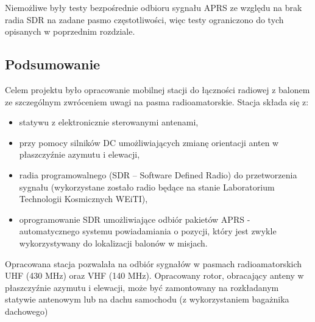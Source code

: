 Niemożliwe były testy bezpośrednie odbioru sygnału APRS ze względu na brak radia SDR na zadane pasmo częstotliwości, więc testy ograniczono do tych opisanych w poprzednim rozdziale.

\subsection{Podsumowanie}

Celem projektu było opracowanie mobilnej stacji do łączności radiowej z
balonem ze szczególnym zwróceniem uwagi na pasma radioamatorskie.
Stacja składa się z:
\begin{itemize}
 \item statywu z elektronicznie sterowanymi antenami,
 \item przy pomocy silników DC umożliwiających zmianę orientacji anten w płaszczyźnie azymutu i elewacji,
 \item radia programowalnego (SDR – Software
Defined Radio) do przetworzenia sygnału (wykorzystane zostało radio
będące na stanie Laboratorium Technologii Kosmicznych WEiTI),
 \item oprogramowanie SDR umożliwiające odbiór pakietów
APRS - automatycznego systemu powiadamiania o pozycji, który jest
zwykle wykorzystywany do lokalizacji balonów w misjach.
\end{itemize}

Opracowana stacja pozwalała na odbiór sygnałów w pasmach
radioamatorskich UHF (430 MHz) oraz VHF (140 MHz).
Opracowany rotor, obracający anteny w płaszczyźnie azymutu i elewacji,
może być zamontowany na rozkładanym statywie antenowym lub na
dachu samochodu (z wykorzystaniem bagażnika dachowego)
